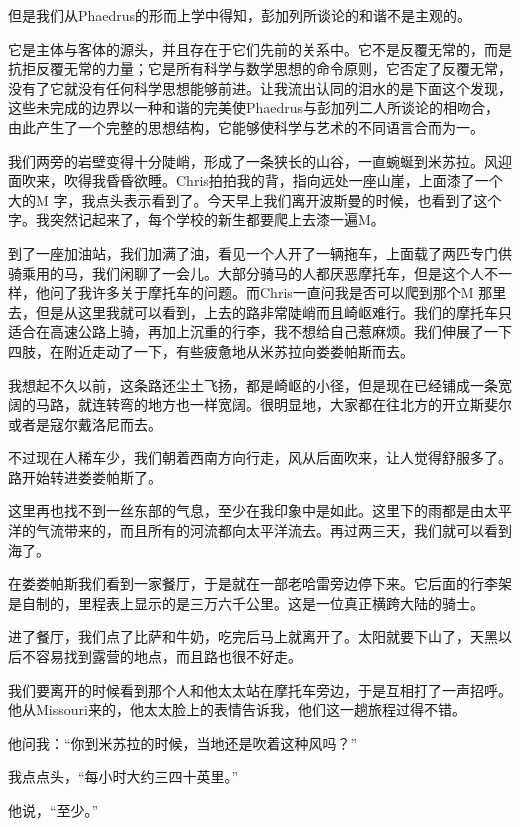 \documentclass[UTF8]{article}
\begin{document}
\par 但是我们从Phaedrus的形而上学中得知，彭加列所谈论的和谐不是主观的。
\par 它是主体与客体的源头，并且存在于它们先前的关系中。它不是反覆无常的，而是抗拒反覆无常的力量；它是所有科学与数学思想的命令原则，它否定了反覆无常，没有了它就没有任何科学思想能够前进。让我流出认同的泪水的是下面这个发现，这些未完成的边界以一种和谐的完美使Phaedrus与彭加列二人所谈论的相吻合，由此产生了一个完整的思想结构，它能够使科学与艺术的不同语言合而为一。
\par 我们两旁的岩壁变得十分陡峭，形成了一条狭长的山谷，一直蜿蜒到米苏拉。风迎面吹来，吹得我昏昏欲睡。Chris拍拍我的背，指向远处一座山崖，上面漆了一个大的M 字，我点头表示看到了。今天早上我们离开波斯曼的时候，也看到了这个字。我突然记起来了，每个学校的新生都要爬上去漆一遍M。
\par 到了一座加油站，我们加满了油，看见一个人开了一辆拖车，上面载了两匹专门供骑乘用的马，我们闲聊了一会儿。大部分骑马的人都厌恶摩托车，但是这个人不一样，他问了我许多关于摩托车的问题。而Chris一直问我是否可以爬到那个M 那里去，但是从这里我就可以看到，上去的路非常陡峭而且崎岖难行。我们的摩托车只适合在高速公路上骑，再加上沉重的行李，我不想给自己惹麻烦。我们伸展了一下四肢，在附近走动了一下，有些疲惫地从米苏拉向娄娄帕斯而去。
\par 我想起不久以前，这条路还尘土飞扬，都是崎岖的小径，但是现在已经铺成一条宽阔的马路，就连转弯的地方也一样宽阔。很明显地，大家都在往北方的开立斯斐尔或者是寇尔戴洛尼而去。
\par 不过现在人稀车少，我们朝着西南方向行走，风从后面吹来，让人觉得舒服多了。路开始转进娄娄帕斯了。
\par 这里再也找不到一丝东部的气息，至少在我印象中是如此。这里下的雨都是由太平洋的气流带来的，而且所有的河流都向太平洋流去。再过两三天，我们就可以看到海了。
\par 在娄娄帕斯我们看到一家餐厅，于是就在一部老哈雷旁边停下来。它后面的行李架是自制的，里程表上显示的是三万六千公里。这是一位真正横跨大陆的骑士。
\par 进了餐厅，我们点了比萨和牛奶，吃完后马上就离开了。太阳就要下山了，天黑以后不容易找到露营的地点，而且路也很不好走。
\par 我们要离开的时候看到那个人和他太太站在摩托车旁边，于是互相打了一声招呼。他从Missouri来的，他太太脸上的表情告诉我，他们这一趟旅程过得不错。
\par 他问我：“你到米苏拉的时候，当地还是吹着这种风吗？”
\par 我点点头，“每小时大约三四十英里。”
\par 他说，“至少。”
\end{document}
